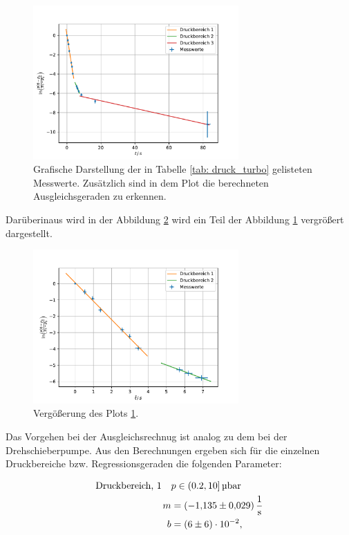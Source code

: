 \FloatBarrier
\begin{figure}[h]
  \centering
  \includegraphics[width=0.7\textwidth]{../Messdaten/plots/turbo/druckplot_turbo.pdf}
  \caption{Grafische Darstellung der in Tabelle \ref{tab: druck_turbo} gelisteten Messwerte. Zusätzlich sind in dem Plot die berechneten Ausgleichsgeraden zu erkennen.}
  \label{fig: druck_turbo}
\end{figure}
\FloatBarrier
Darüberinaus wird in der Abbildung \ref{fig: druck_turbo_zoom} wird ein Teil der Abbildung \ref{fig: druck_turbo} vergrößert dargestellt. %

\FloatBarrier
\begin{figure}[h]
  \centering
  \includegraphics[width=0.7\textwidth]{../Messdaten/plots/turbo/druckplot_turbo_zoom.pdf}
  \caption{Vergößerung des Plots \ref{fig: druck_turbo}.}
  \label{fig: druck_turbo_zoom}
\end{figure}
\FloatBarrier
Das Vorgehen bei der Ausgleichsrechnug ist analog zu dem bei der Drehschieberpumpe.
Aus den Berechnungen ergeben sich für die einzelnen Druckbereiche bzw. Regressionsgeraden die
folgenden Parameter:

\begin{align}
  \label{eq: regression_turbo_druck_1}
  \begin{aligned}
  \text{Druckbereich, 1} \quad  &p\in(0.2,10]\,\si{\micro\bar}  \\
  m&=\SI{-1.135\pm0.029 }{\per\second} \\
  b&=\num{ 6 \pm 6 e-2 },
\end{aligned}
\end{align}

